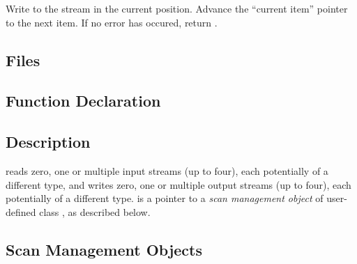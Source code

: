      {Write  to the
stream in the current position. Advance the ``current item'' pointer to the
next item. If no error has occured, return .}
        
  \etabb
{}



\subsection{Files}
  \btabb
     {}
  \etabb

\subsection{Function Declaration}
  \btabb
     {}
  \etabb

\subsection{Description}

 reads zero, one or multiple input streams (up to
four), each potentially of a different type, and writes zero, one or
multiple output streams (up to four), each potentially of a different type.
 is a pointer to a {\em scan management object} of user-defined
class , as described below.  

\subsection{Scan Management Objects}


